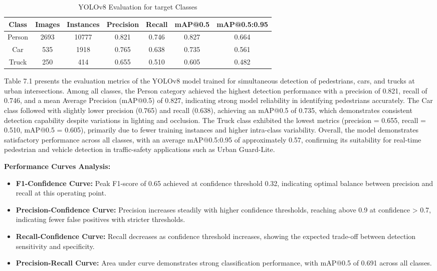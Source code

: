 \documentclass[a4paper, 12pt]{report}
\begin{document}
\begin{table}[H]
\centering
\caption{YOLOv8 Evaluation for target Classes}
\begin{tabular}{|c|c|c|c|c|c|c|}
\hline
\textbf{Class} & \textbf{Images} & \textbf{Instances} & \textbf{Precision} & \textbf{Recall} & \textbf{mAP@0.5} & \textbf{mAP@0.5:0.95} \\
\hline
Person & 2693 & 10777 & 0.821 & 0.746 & 0.827 & 0.664 \\
\hline
Car & 535 & 1918 & 0.765 & 0.638 & 0.735 & 0.561 \\
\hline
Truck & 250 & 414 & 0.655 & 0.510 & 0.605 & 0.482 \\
\hline
\end{tabular}
\end{table}
Table 7.1 presents the evaluation metrics of the YOLOv8 model trained for simultaneous detection of pedestrians, cars, and trucks at urban intersections. Among all classes, the Person category achieved the highest detection performance with a precision of 0.821, recall of 0.746, and a mean Average Precision (mAP@0.5) of 0.827, indicating strong model reliability in identifying pedestrians accurately. The Car class followed with slightly lower precision (0.765) and recall (0.638), achieving an mAP@0.5 of 0.735, which demonstrates consistent detection capability despite variations in lighting and occlusion. The Truck class exhibited the lowest metrics (precision = 0.655, recall = 0.510, mAP@0.5 = 0.605), primarily due to fewer training instances and higher intra-class variability. Overall, the model demonstrates satisfactory performance across all classes, with an average mAP@0.5:0.95 of approximately 0.57, confirming its suitability for real-time pedestrian and vehicle detection in traffic-safety applications such as Urban Guard-Lite.

\textbf{Performance Curves Analysis:}

\begin{itemize}[itemsep=-4pt]
    \item \textbf{F1-Confidence Curve:} Peak F1-score of 0.65 achieved at confidence threshold 0.32, indicating optimal balance between precision and recall at this operating point.
    \item \textbf{Precision-Confidence Curve:} Precision increases steadily with higher confidence thresholds, reaching above 0.9 at confidence > 0.7, indicating fewer false positives with stricter thresholds.
    \item \textbf{Recall-Confidence Curve:} Recall decreases as confidence threshold increases, showing the expected trade-off between detection sensitivity and specificity.
    \item \textbf{Precision-Recall Curve:} Area under curve demonstrates strong classification performance, with mAP@0.5 of 0.691 across all classes.
\end{itemize}
\end{document}

